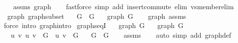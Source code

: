 \begin{isabellebody}
\endisataginvisible
{\isafoldinvisible}%
%
\isadeliminvisible
\isanewline
%
\endisadeliminvisible
%
\isadelimproof
\ \ %
\endisadelimproof
%
\isatagproof
{}\isamarkupfalse%
\ assms\ graph\isanewline
\ \ \isamarkupfalse%
\ {\isacharparenleft}{\kern0pt}fastforce\ simp\ add{\isacharcolon}{\kern0pt}\ insert{\isacharunderscore}{\kern0pt}commute\ elim{\isacharcolon}{\kern0pt}\ vs{\isacharunderscore}{\kern0pt}member{\isacharunderscore}{\kern0pt}elim{\isacharparenright}{\kern0pt}%
\endisatagproof
{\isafoldproof}%
%
\isadelimproof
\isanewline
%
\endisadelimproof
\isanewline
{}\isamarkupfalse%
\ {\isacharparenleft}{\kern0pt}\ graph{\isacharparenright}{\kern0pt}\ graph{\isacharunderscore}{\kern0pt}subset{\isacharcolon}{\kern0pt}\isanewline
\ \ \ {\isachardoublequoteopen}G{\isacharprime}{\kern0pt}\ {\isasymsubseteq}\ G{\isachardoublequoteclose}\isanewline
\ \ \ {\isachardoublequoteopen}graph\ G{\isacharprime}{\kern0pt}{\isachardoublequoteclose}\isanewline
%
\isadelimproof
\ \ %
\endisadelimproof
%
\isatagproof
{}\isamarkupfalse%
\ graph\ assms\isanewline
\ \ \isamarkupfalse%
\ {\isacharparenleft}{\kern0pt}force\ intro{\isacharcolon}{\kern0pt}\ graph{\isachardot}{\kern0pt}intro{\isacharparenright}{\kern0pt}%
\endisatagproof
{\isafoldproof}%
%
\isadelimproof
\isanewline
%
\endisadelimproof
\isanewline
{}\isamarkupfalse%
\ graphs{\isacharunderscore}{\kern0pt}eqI{\isacharcolon}{\kern0pt}\isanewline
\ \ \ {\isachardoublequoteopen}graph\ G{}{\isachardoublequoteclose}\isanewline
\ \ \ {\isachardoublequoteopen}graph\ G{}{\isachardoublequoteclose}\isanewline
\ \ \ {\isachardoublequoteopen}{\isasymAnd}u\ v{\isachardot}{\kern0pt}\ {\isacharbraceleft}{\kern0pt}u{\isacharcomma}{\kern0pt}\ v{\isacharbraceright}{\kern0pt}\ {\isasymin}\ G{}\ {\isasymlongleftrightarrow}\ {\isacharbraceleft}{\kern0pt}u{\isacharcomma}{\kern0pt}\ v{\isacharbraceright}{\kern0pt}\ {\isasymin}\ G{}{\isachardoublequoteclose}\isanewline
\ \ \ {\isachardoublequoteopen}G{}\ {\isacharequal}{\kern0pt}\ G{}{\isachardoublequoteclose}\isanewline
%
\isadelimproof
\ \ %
\endisadelimproof
%
\isatagproof
{}\isamarkupfalse%
\ assms\isanewline
\ \ \isamarkupfalse%
\ {\isacharparenleft}{\kern0pt}auto\ simp\ add{\isacharcolon}{\kern0pt}\ graph{\isacharunderscore}{\kern0pt}def{\isacharparenright}{\kern0pt}%

\end{isabellebody}
